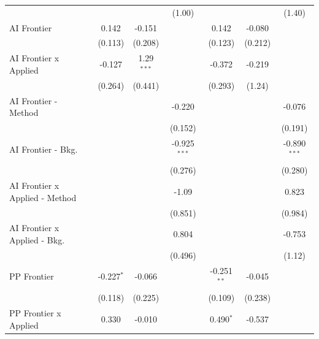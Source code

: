 \begin{tabular}{lcccccc}
                                  &               &              & (1.00)         &               &             & (1.40)\\   
   AI Frontier                    & 0.142         & -0.151       &                & 0.142         & -0.080      &   \\   
                                  & (0.113)       & (0.208)      &                & (0.123)       & (0.212)     &   \\   
   AI Frontier x Applied          & -0.127        & 1.29$^{***}$ &                & -0.372        & -0.219      &   \\   
                                  & (0.264)       & (0.441)      &                & (0.293)       & (1.24)      &   \\   
   AI Frontier - Method           &               &              & -0.220         &               &             & -0.076\\   
                                  &               &              & (0.152)        &               &             & (0.191)\\   
   AI Frontier - Bkg.             &               &              & -0.925$^{***}$ &               &             & -0.890$^{***}$\\   
                                  &               &              & (0.276)        &               &             & (0.280)\\   
   AI Frontier x Applied - Method &               &              & -1.09          &               &             & 0.823\\   
                                  &               &              & (0.851)        &               &             & (0.984)\\   
   AI Frontier x Applied - Bkg.   &               &              & 0.804          &               &             & -0.753\\   
                                  &               &              & (0.496)        &               &             & (1.12)\\   
   PP Frontier                    & -0.227$^{*}$  & -0.066       &                & -0.251$^{**}$ & -0.045      &   \\   
                                  & (0.118)       & (0.225)      &                & (0.109)       & (0.238)     &   \\   
   PP Frontier x Applied          & 0.330         & -0.010       &                & 0.490$^{*}$   & -0.537      &   \\   

\end{tabular}
